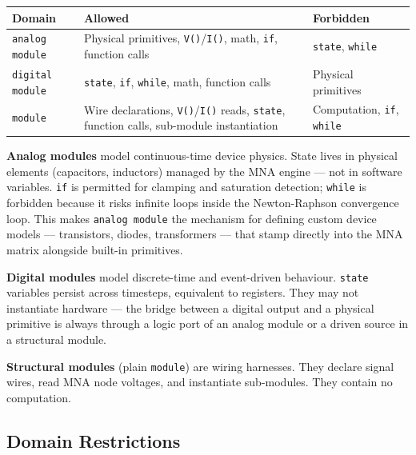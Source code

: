 \documentclass[11pt, a4paper]{article}
\newcommand{\code}[1]{\texttt{\small #1}}
\begin{document}
\begin{center}
\renewcommand{\arraystretch}{1.5}
\begin{tabular}{@{} L{3cm} L{4.5cm} L{4.5cm} @{}}
\toprule
\textbf{Domain} & \textbf{Allowed} & \textbf{Forbidden} \\
\midrule
\code{analog module}
    & Physical primitives, \code{V()}/\code{I()}, math, \code{if},
      function calls
    & \code{state}, \code{while} \\
\code{digital module}
    & \code{state}, \code{if}, \code{while}, math, function calls
    & Physical primitives \\
\code{module}
    & Wire declarations, \code{V()}/\code{I()} reads, \code{state}, function calls,
      sub-module instantiation
    & Computation, \code{if}, \code{while} \\
\bottomrule
\end{tabular}
\end{center}

\textbf{Analog modules} model continuous-time device physics. State lives in
physical elements (capacitors, inductors) managed by the MNA engine — not in
software variables. \code{if} is permitted for clamping and saturation
detection; \code{while} is forbidden because it risks infinite loops inside
the Newton-Raphson convergence loop. This makes \code{analog module} the mechanism for defining custom
device models --- transistors, diodes, transformers --- that stamp
directly into the MNA matrix alongside built-in primitives.

\textbf{Digital modules} model discrete-time and event-driven behaviour.
\code{state} variables persist across timesteps, equivalent to registers.
They may not instantiate hardware — the bridge between a digital output and
a physical primitive is always through a logic port of an analog module or a
driven source in a structural module.

\textbf{Structural modules} (plain \code{module}) are wiring harnesses. They
declare signal wires, read MNA node voltages, and instantiate sub-modules.
They contain no computation.

\subsection{Domain Restrictions}
\end{document}
